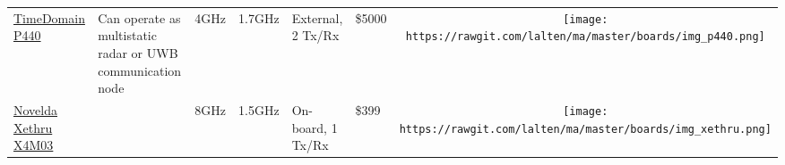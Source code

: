 \begin{longtable}[]{@{}llllllc@{}}
\begin{minipage}[t]{0.09\columnwidth}\raggedright\strut
	\href{http://www.timedomain.com/products/pulson-440/}{TimeDomain P440}
\strut\end{minipage} &
\begin{minipage}[t]{0.13\columnwidth}\raggedright\strut
Can operate as multistatic radar or UWB communication node
\strut\end{minipage} &
\begin{minipage}[t]{0.09\columnwidth}\raggedright\strut
4GHz
\strut\end{minipage} &
\begin{minipage}[t]{0.11\columnwidth}\raggedright\strut
1.7GHz
\strut\end{minipage} &
\begin{minipage}[t]{0.10\columnwidth}\raggedright\strut
External, 2 Tx/Rx
\strut\end{minipage} &
\begin{minipage}[t]{0.15\columnwidth}\raggedright\strut
\$5000
\strut\end{minipage} &
\begin{minipage}[t]{0.10\columnwidth}\centering\strut
\texttt{[image: https://rawgit.com/lalten/ma/master/boards/img\_p440.png]}
\strut\end{minipage}\tabularnewline

\begin{minipage}[t]{0.09\columnwidth}\raggedright\strut
	\href{https://www.xethru.com/xethru-development-platform.html}{Novelda Xethru X4M03}
\strut\end{minipage} &
\begin{minipage}[t]{0.13\columnwidth}\raggedright\strut

\strut\end{minipage} &
\begin{minipage}[t]{0.09\columnwidth}\raggedright\strut
8GHz
\strut\end{minipage} &
\begin{minipage}[t]{0.11\columnwidth}\raggedright\strut
1.5GHz
\strut\end{minipage} &
\begin{minipage}[t]{0.10\columnwidth}\raggedright\strut
On-board, 1 Tx/Rx
\strut\end{minipage} &
\begin{minipage}[t]{0.15\columnwidth}\raggedright\strut
\$399
\strut\end{minipage} &
\begin{minipage}[t]{0.10\columnwidth}\centering\strut
\texttt{[image: https://rawgit.com/lalten/ma/master/boards/img\_xethru.png]}
\strut\end{minipage}\tabularnewline


\end{longtable}
